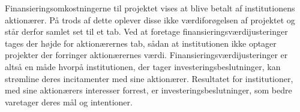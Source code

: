 \documentclass[main.tex]{subfiles}
\begin{document}
\begin{adjustwidth}{-1cm}{-1cm}
    Finansieringsomkostningerne til projektet vises at blive betalt af institutionens aktionærer.
    På trods af dette oplever disse ikke værdiforøgelsen af projektet
    og står derfor samlet set til et tab.
    Ved at foretage finansieringsværdijusteringer tages der højde for aktionærernes tab,
    sådan at institutionen ikke optager projekter der forringer aktionærernes værdi.
    Finansieringsværdijusteringer er altså en måde hvorpå institutionen, 
    der tager investeringsbeslutninger, kan strømline deres incitamenter med sine aktionærer. 
    Resultatet for institutioner, med sine aktionærers interesser forrest,
    er investeringsbeslutninger, som bedre varetager deres mål og intentioner.
    
    \end{adjustwidth}
\end{document}
